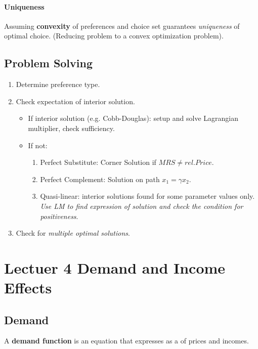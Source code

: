 \documentclass[]{article}
\begin{document}
            \paragraph{Uniqueness} Assuming \textbf{convexity} of preferences and choice set guarantees \emph{uniqueness} of optimal choice. (Reducing problem to a convex optimization problem).
        
        \subsection{Problem Solving}
            \begin{enumerate}
                \item Determine preference type.
                \item Check expectation of interior solution.
                \begin{itemize}
                    \item If interior solution (e.g. Cobb-Douglas): setup and solve Lagrangian multiplier, check sufficiency.
                    \item If not:
                    \begin{enumerate}
                        \item Perfect Substitute: Corner Solution if $MRS \neq rel.Price$.
                        \item Perfect Complement: Solution on path $x_1=\gamma x_2$.
                        \item Quasi-linear: interior solutions found for some parameter values only. \emph{Use LM to find expression of solution and check the condition for positiveness}.
                    \end{enumerate}
                \end{itemize}
                \item Check for \emph{multiple optimal solutions}.
            \end{enumerate}
            
    \section{Lectuer 4 Demand and Income Effects}
        \subsection{Demand}
            \begin{definition}
                A \textbf{demand function} is an equation that expresses  as a  of prices and incomes.
            \end{definition}
            
\end{document}
